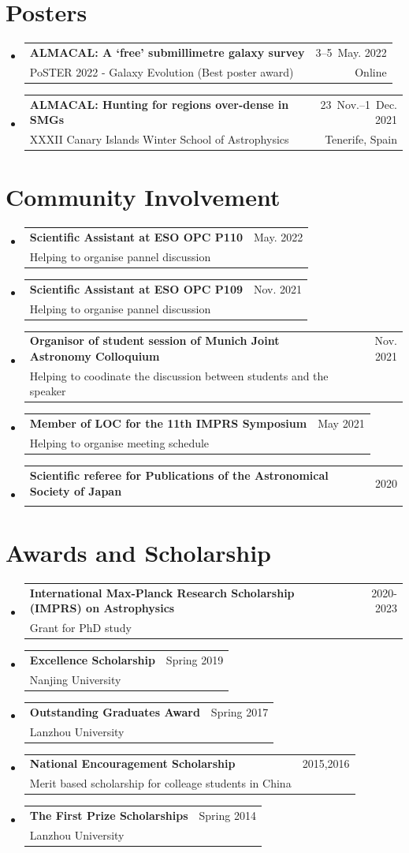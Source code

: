 \documentclass[A4,11pt]{article}
\makeatletter
\newcommand{\CVSubheading}[4]{
  \vspace{-2pt}\item
    \begin{tabular*}{0.97\textwidth}[t]{l@{\extracolsep{\fill}}r}
      \textbf{#1} & #2 \\
      \small#3 & \small #4 \\
    \end{tabular*}\vspace{-7pt}
}
\newcommand{\CVSubHeadingListStart}{\begin{itemize}[leftmargin=0.5cm, label={}]}
\newcommand{\CVSubHeadingListEnd}{\end{itemize}}
\makeatother
\begin{document}
\section{Posters}
  \CVSubHeadingListStart
    \CVSubheading
      {ALMACAL: A `free' submillimetre galaxy survey}{3--5~May. 2022}
      {PoSTER 2022 - Galaxy Evolution (Best poster award)}{Online}
    \CVSubheading
      {ALMACAL: Hunting for regions over-dense in SMGs}{23~Nov.--1~Dec. 2021}
      {XXXII Canary Islands Winter School of Astrophysics}{Tenerife, Spain}
  \CVSubHeadingListEnd

\section{Community Involvement}
  \CVSubHeadingListStart
    \CVSubheading
      {Scientific Assistant at ESO OPC P110}{May. 2022}
      {Helping to organise pannel discussion}{}
    \CVSubheading
      {Scientific Assistant at ESO OPC P109}{Nov. 2021}
      {Helping to organise pannel discussion}{}
    \CVSubheading
      {Organisor of student session of Munich Joint Astronomy Colloquium}{Nov. 2021}
      {Helping to coodinate the discussion between students and the speaker}{}
    \CVSubheading
      {Member of LOC for the 11th IMPRS Symposium}{May 2021}
      {Helping to organise meeting schedule}{}

    \CVSubheading
      {Scientific referee for Publications of the Astronomical Society of Japan}{2020}
      {}{}
  \CVSubHeadingListEnd

\section{Awards and Scholarship}
  \CVSubHeadingListStart
    \CVSubheading
      {International Max-Planck Research Scholarship (IMPRS) on Astrophysics}{2020-2023}
      {Grant for PhD study}{}
    \CVSubheading
      {Excellence Scholarship}{Spring 2019}
      {Nanjing University}{}
    \CVSubheading
      {Outstanding Graduates Award}{Spring 2017}
      {Lanzhou University}{}
    \CVSubheading
      {National Encouragement Scholarship}{2015,2016}
      {Merit based scholarship for colleage students in China}{}
    \CVSubheading
      {The First Prize Scholarships}{Spring 2014}
      {Lanzhou University}{}
  \CVSubHeadingListEnd
\end{document}
